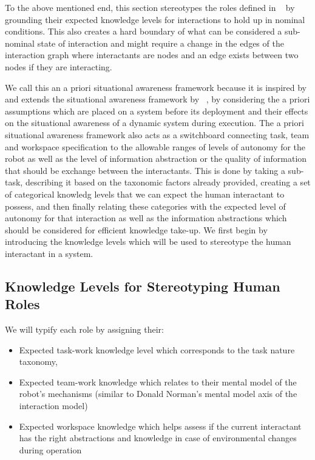 \documentclass[letterpaper, 10 pt, conference]{ieeeconf} %
\theoremstyle{definition} \newtheorem{definition}{Definition}
\newcommand{\citet}[1]{\citeauthor{#1}~\cite{#1}}
\begin{document}
To the above mentioned end, this section
stereotypes the roles defined in \citet{Goodrich2007,Scholtz2003} by
grounding their expected knowledge levels for interactions to hold up in
nominal conditions. This also creates a hard boundary of what can be
considered a sub-nominal state of interaction and might require a change in
the edges of the interaction graph where interactants are nodes and an edge
exists between two nodes if they are interacting.

We call this an a priori situational awareness framework because it is inspired
by and extends the situational awareness framework by \citet{Endsley1995}, by considering the a priori assumptions which are placed on a system before its
deployment and their effects on the situational awareness of a dynamic system
during execution. The a priori situational awareness framework also acts as a
switchboard connecting task, team and workspace specification to the allowable
ranges of levels of autonomy for the robot as well as the level of information
abstraction or the quality of information that should be exchange between the
interactants. This is done by taking a sub-task, describing it based on the
taxonomic factors already provided, creating a set of categorical knowledg
levels that we can expect the human interactant to possess, and then finally
relating these categories with the expected level of autonomy for that
interaction as well as the information abstractions which should be considered
for efficient knowledge take-up. We first begin by introducing the
knowledge levels which will be used to stereotype the human interactant in a
system.

\subsection{Knowledge Levels for Stereotyping Human Roles}

We will typify each role by assigning their:
\begin{itemize}
  \item Expected task-work knowledge level which corresponds to the task nature
        taxonomy,
  \item Expected team-work knowledge which relates to their mental model of the
        robot's mechanisms (similar to Donald Norman's mental model axis of the
        interaction model)
  \item Expected workspace knowledge which helps assess if the current
        interactant has the right abstractions and knowledge in case of
        environmental changes during operation
\end{itemize}
\end{document}
